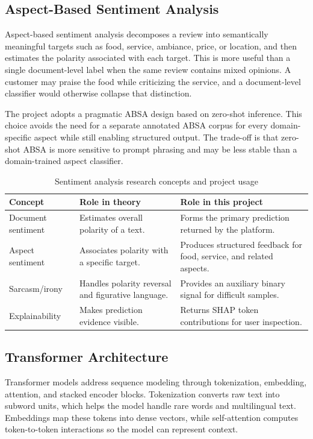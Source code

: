 \documentclass[12pt, a4paper]{article}
\begin{document}
\subsection{Aspect-Based Sentiment Analysis}
Aspect-based sentiment analysis decomposes a review into semantically meaningful targets such as food, service, ambiance, price, or location, and then estimates the polarity associated with each target. This is more useful than a single document-level label when the same review contains mixed opinions. A customer may praise the food while criticizing the service, and a document-level classifier would otherwise collapse that distinction.

The project adopts a pragmatic ABSA design based on zero-shot inference. This choice avoids the need for a separate annotated ABSA corpus for every domain-specific aspect while still enabling structured output. The trade-off is that zero-shot ABSA is more sensitive to prompt phrasing and may be less stable than a domain-trained aspect classifier.

\begin{table}[H]
\centering
\caption{Sentiment analysis research concepts and project usage}
\begin{tabularx}{\textwidth}{@{} p{3.5cm} p{3.2cm} X @{}}
\toprule
\textbf{Concept} & \textbf{Role in theory} & \textbf{Role in this project} \\
\midrule
Document sentiment & Estimates overall polarity of a text. & Forms the primary prediction returned by the platform. \\
Aspect sentiment & Associates polarity with a specific target. & Produces structured feedback for food, service, and related aspects. \\
Sarcasm/irony & Handles polarity reversal and figurative language. & Provides an auxiliary binary signal for difficult samples. \\
Explainability & Makes prediction evidence visible. & Returns SHAP token contributions for user inspection. \\
\bottomrule
\end{tabularx}
\end{table}

\subsection{Transformer Architecture}
Transformer models address sequence modeling through tokenization, embedding, attention, and stacked encoder blocks. Tokenization converts raw text into subword units, which helps the model handle rare words and multilingual text. Embeddings map these tokens into dense vectors, while self-attention computes token-to-token interactions so the model can represent context.
\end{document}
